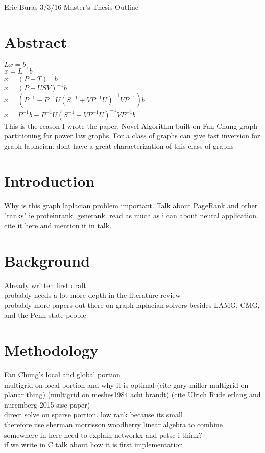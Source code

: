\documentclass{article}
\begin{document}
Eric Buras 3/3/16 Master's Thesis Outline
\\
\section{Abstract}

$Lx=b$\\
$x = L^{-1}b$\\
$x = (P+T)^{-1}b$\\
$x = (P+USV)^{-1}b$\\
$x = (P^{-1}-P^{-1}U(S^{-1}+VP^{-1}U)^{-1}VP^{-1})b$\\
$x = P^{-1}b-P^{-1}U(S^{-1}+VP^{-1}U)^{-1}VP^{-1}b$\\

This is the reason I wrote the paper. Novel Algorithm built on Fan Chung graph partitioning for power law graphs. For a class of graphs can give fast inversion for graph laplacian. dont have a great characterization of this class of graphs

\section{Introduction}
Why is this graph laplacian problem important. Talk about PageRank and other "ranks" ie proteinrank, generank. read as much as i can about neural application. cite it here and mention it in talk.

\section{Background}
Already written first draft\\
probably needs a lot more depth in the literature review\\
probably more papers out there on graph laplacian solvers besides LAMG, CMG, and the Penn state people

\section{Methodology}
Fan Chung's local and global portion\\
multigrid on local portion and why it is optimal (cite gary miller multigrid on planar thing) (multigrid on meshes1984 achi brandt) (cite Ulrich Rude erlang and nuremberg 2015 sisc paper)\\
direct solve on sparse portion. low rank because its small\\
therefore use sherman morrisson woodberry linear algebra to combine\\
somewhere in here need to explain networkx and petsc i think?\\
if we write in C talk about how it is first implementation
\end{document}
